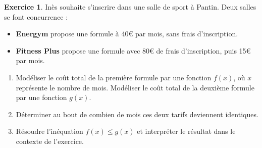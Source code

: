 \documentclass{article}
\theoremstyle{definition}
\newtheorem{exercice}{Exercice}
\begin{document}
\begin{exercice}

  Inès souhaite s'inscrire dans une salle de sport à Pantin. Deux salles se font concurrence :

  \begin{itemize}
    \item \textbf{Energym} propose une formule à 40€ par mois, sans frais d'inscription.
    \item \textbf{Fitness Plus} propose une formule avec 80€ de frais d'inscription, puis 15€ par mois.
  \end{itemize}

  \begin{enumerate}
    \item Modéliser le coût total de la première formule par une fonction \(f(x)\), où \(x\) représente le nombre de mois.
      Modéliser le coût total de la deuxième formule par une fonction \(g(x)\).
    \item Déterminer au bout de combien de mois ces deux tarifs deviennent identiques.
    \item Résoudre l'inéquation \(f(x) \le g(x)\) et interpréter le résultat dans le contexte de l'exercice.
  \end{enumerate}
  \begin{center}
  \end{center}
\end{exercice}

%
%
\end{document}

